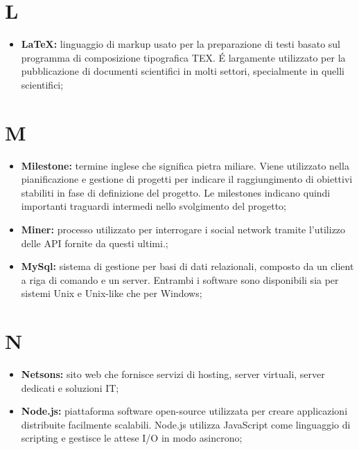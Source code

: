 %


\section*{\Huge L} %
\label{sec:l}
	\begin{itemize}
		\item \textbf{\LaTeX:} linguaggio di markup usato per la preparazione di testi basato sul programma di composizione tipografica TEX. É largamente utilizzato per la pubblicazione di documenti scientifici in molti settori, specialmente in quelli scientifici;
	\end{itemize}
\pagebreak

\section*{\Huge M} %
\label{sec:m}
	\begin{itemize}
		\item \textbf{Milestone:} termine inglese che significa pietra miliare. Viene utilizzato nella pianificazione e gestione di progetti per indicare il raggiungimento di obiettivi stabiliti in fase di definizione del progetto. Le milestones indicano quindi importanti traguardi intermedi nello svolgimento del progetto;
		\item \textbf{Miner:} processo utilizzato per interrogare i social network tramite l'utilizzo delle API fornite da questi ultimi.;	
		\item \textbf{MySql:} sistema di gestione per basi di dati relazionali, composto da un client a riga di comando e un server. Entrambi i software sono disponibili sia per sistemi Unix e Unix-like che per Windows;
	\end{itemize}
\pagebreak

\section*{\Huge N} %
\label{sec:n}
	\begin{itemize}
		\item \textbf{Netsons:} sito web che fornisce servizi di hosting, server virtuali, server dedicati e soluzioni IT;
		\item \textbf{Node.js:} piattaforma software open-source utilizzata per creare applicazioni distribuite facilmente scalabili. Node.js utilizza JavaScript come linguaggio di scripting e gestisce le attese I/O in modo asincrono;
	\end{itemize}
\pagebreak
